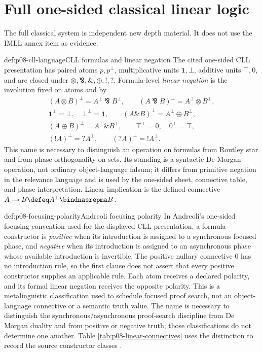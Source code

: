 \section{Full one-sided classical linear logic}
\label{sec:p08-cll}

The full classical system is independent new depth material.  It does not use
the IMLL annex item as evidence.

\begin{hbdefinition}{def:p08-cll-language}{CLL formulas and linear negation}
The cited one-sided CLL presentation has paired atoms
\(p,p^\perp\), multiplicative units \(\mathbf 1,\bot\), additive units
\(\top,0\), and are closed under
\(\otimes,\bindnasrepma,\mathbin{\&},\oplus,!,?\).  Formula-level
\emph{linear negation} is the involution fixed on atoms and by
\[
\begin{gathered}
 (A\otimes B)^\perp=A^\perp\bindnasrepma B^\perp,
 \qquad
 (A\bindnasrepma B)^\perp=A^\perp\otimes B^\perp,\\
 \mathbf 1^\perp=\bot,\quad \bot^\perp=\mathbf 1,\qquad
 (A\mathbin{\&}B)^\perp=A^\perp\oplus B^\perp,\\
 (A\oplus B)^\perp=A^\perp\mathbin{\&}B^\perp,
 \qquad \top^\perp=0,\quad 0^\perp=\top,\\
 (!A)^\perp=?A^\perp,\qquad(?A)^\perp=!A^\perp.
\end{gathered}
\]
This name is necessary to distinguish an operation on formulas from Routley
star and from phase orthogonality on sets.  Its standing is a syntactic De
Morgan operation, not ordinary object-language falsum; it differs from
primitive negation in the relevance language and is used by the one-sided
sheet, connective table, and phase interpretation.  Linear implication is the
defined connective \(A\multimap B\defeq A^\perp\bindnasrepma B\).
\end{hbdefinition}

\begin{hbdefinition}{def:p08-focusing-polarity}{Andreoli focusing polarity}
In Andreoli's one-sided focusing convention used for the displayed CLL
presentation, a formula constructor is
\emph{positive} when its introduction is assigned to a synchronous focused
phase, and \emph{negative} when its introduction is assigned to an
asynchronous phase whose available introduction is invertible.  The positive
nullary connective \(0\) has no introduction rule, so the first clause does
not assert that every positive constructor supplies an applicable rule.  Each
atom receives a declared polarity, and its formal linear negation receives the
opposite polarity.  This is a metalinguistic classification used to schedule
focused proof search, not an object-language connective or a semantic truth
value.  The name is necessary to distinguish the synchronous/asynchronous
proof-search discipline from De Morgan duality and from positive or negative
truth; those classifications do not determine one another.  Table
\ref{tab:p08-linear-connectives} uses the distinction to record the source
constructor classes \cite{Andreoli1992}.
\end{hbdefinition}

